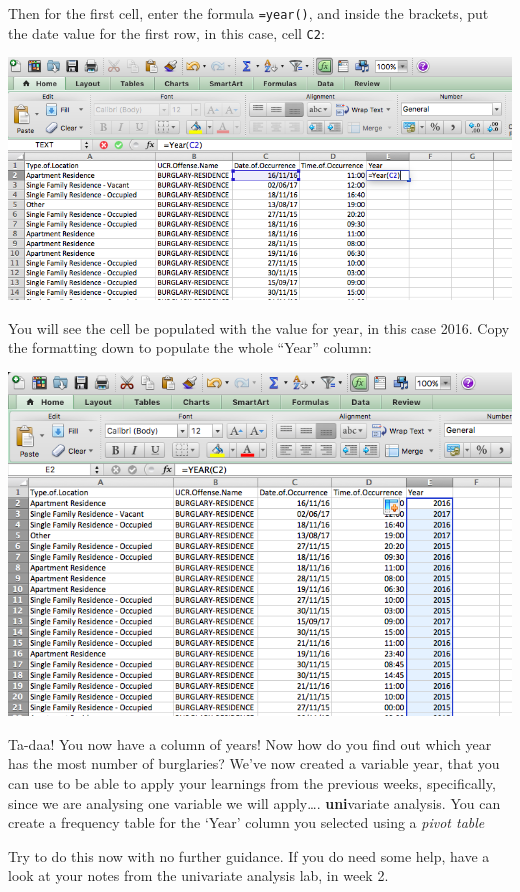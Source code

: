 \documentclass[
]{book}
\begin{document}
Then for the first cell, enter the formula \texttt{=year()}, and inside the brackets, put the date value for the first row, in this case, cell \texttt{C2}:

\includegraphics{imgs/extract_year_formula.png}

You will see the cell be populated with the value for year, in this case 2016. Copy the formatting down to populate the whole ``Year'' column:

\includegraphics{imgs/year_col_pop.png}

Ta-daa! You now have a column of years! Now how do you find out which year has the most number of burglaries? We've now created a variable year, that you can use to be able to apply your learnings from the previous weeks, specifically, since we are analysing one variable we will apply\ldots. \textbf{uni}variate analysis. You can create a frequency table for the `Year' column you selected using a \emph{pivot table}

Try to do this now with no further guidance. If you do need some help, have a look at your notes from the univariate analysis lab, in week 2.
\end{document}
